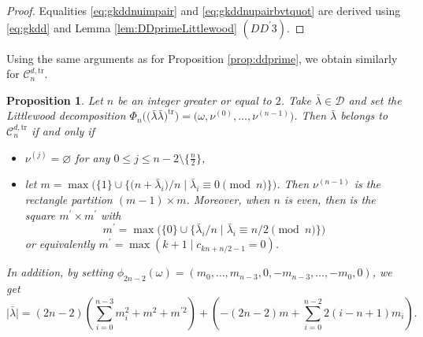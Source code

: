 \documentclass[pdftex]{sigma}
\newtheorem{Proposition}[Theorem]{Proposition}
 { \theoremstyle{definition}
\newtheorem{Definition}[Theorem]{Definition}
\newtheorem{Note}[Theorem]{Note}
\newtheorem{Example}[Theorem]{Example}
\newtheorem{Remark}[Theorem]{Remark} }
\numberwithin{equation}{section}
\newcommand{\cC}{\mathcal{C}}
\def\ccd{\mathcal {D}}
\newcommand{\N}{\mathbb{N}}
\begin{document}
\begin{proof}
	Equalities \eqref{eq:gkddnuimpair} and \eqref{eq:gkddnupairbvtquot} are
	derived using \eqref{eq:gkdd} and Lemma \ref{lem:DDprimeLittlewood} $%
	(DD^{\prime }3)$.
\end{proof}


Using the same arguments as for Proposition \ref{prop:ddprime}, we obtain
similarly for $\cC_{n}^{d,\mathrm{tr}}$.

\begin{Proposition}
\label{prop:ddprimepair} Let $n$ be an integer greater or equal to $2$. Take
$\bar{\lambda}\in\ccd$ and set the Littlewood decomposition $\Phi_n\bigl(\bigl(\bar{
\lambda}\bar{\lambda}\bigr)^\mathrm{tr}\bigr)=\bigl(\omega,\nu^{(0)},\dots,\nu^{(n-1)}
\bigr)$. Then $\bar{\lambda}$ belongs to $\cC_{n}^{d,\mathrm{tr}} $ if and
only if
\begin{itemize}\itemsep=0pt
\item $\nu^{(j)}=\varnothing$ for any $0\leq j\leq n-2\setminus\bigl\lbrace\frac{n}{
2}\bigr\rbrace$,

\item let $m=\max\bigl(\bigl\lbrace 1\rbrace\cup\lbrace\bigl(n+\bar{\lambda}_i\bigr)/n \mid%
\bar{\lambda}_i\equiv 0\pmod{n}\bigr\rbrace\bigr)$. Then $\nu^{(n-1)}$ is the rectangle partition $(m-1)\times m$. Moreover, when $n$ is even, then  is the square $m^{\prime }\times m^{\prime }$ with
\[
m^{\prime}=\max\bigl(\lbrace 0\rbrace\cup\bigl\lbrace \bar{\lambda}_i/n \mid\bar{\lambda}_i\equiv n/2\pmod{n}\bigr\rbrace\bigr)
\]
or equivalently $m^{\prime
}=\max(k+1\mid c_{kn+n/2-1}= 0)$.
\end{itemize}

In addition, by setting $\phi_{2n-2}(\omega)=(m_0,\dots,m_{n-3},0,-m_{n-3},\dots,-m_0,0)$, we get
\begin{equation*}
\bigl\lvert \bar{\lambda}\bigr\rvert=(2n-2)\left(\sum_{i=0}^{n-3}m_i^2+m^2+m^{\prime
2}\right)+\left(-(2n-2)m+\sum_{i=0}^{n-2}2(i-n+1)m_i\right).
\end{equation*}
\end{Proposition}
\end{document}
